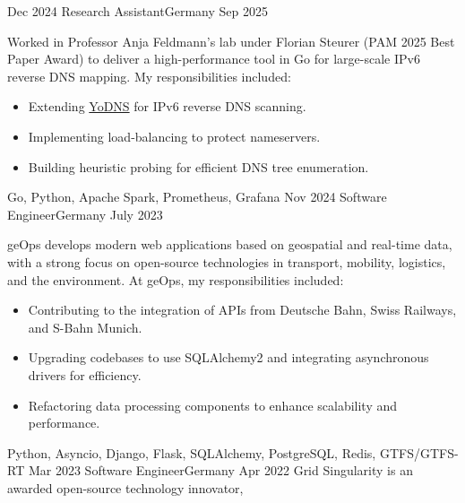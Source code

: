 %
%
%

\begin{experiences}
  \experience
    {Dec 2024} {Research Assistant}{}{Germany}
    {Sep 2025} {
        Worked in Professor Anja Feldmann’s lab under Florian Steurer (PAM 2025 Best Paper Award)
        to deliver a high-performance tool in Go for large-scale IPv6 reverse DNS mapping.
        My responsibilities included:
        \begin{itemize}
            \item Extending \href{https://github.com/DNS-MSMT-INET/yodns}{YoDNS} for IPv6 reverse DNS scanning.
            \item Implementing load-balancing to protect nameservers.
            \item Building heuristic probing for efficient DNS tree enumeration.
        \end{itemize}
    }
    {Go, Python, Apache Spark, Prometheus, Grafana}
  \emptySeparator
  \experience
    {Nov 2024} {Software Engineer}{}{Germany}
    {July 2023} {
      geOps develops modern web applications based on geospatial and real-time data,
      with a strong focus on open-source technologies in transport, mobility, logistics,
      and the environment. At geOps, my responsibilities included:
      \begin{itemize}
        \item Contributing to the integration of APIs from Deutsche Bahn, Swiss Railways, and S-Bahn Munich.
        \item Upgrading codebases to use SQLAlchemy2 and integrating asynchronous drivers for efficiency.
        \item Refactoring data processing components to enhance scalability and performance.
      \end{itemize}
    }
    {Python, Asyncio, Django, Flask, SQLAlchemy, PostgreSQL, Redis, GTFS/GTFS-RT}
  \emptySeparator
  \experience
  {Mar 2023} {Software Engineer}{}{Germany}
  {Apr 2022} {
    Grid Singularity is an awarded open-source technology innovator,
}
\end{experiences}

